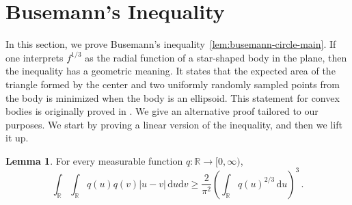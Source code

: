 \documentclass[reqno, 11pt]{amsart}
\theoremstyle{definition}
\newtheorem{lemma}{Lemma}
\newcommand{\abs}[1]{\left\lvert#1\right\rvert}
\newcommand{\dd}{\mathrm{d}}
\begin{document}
\section{Busemann's Inequality}\label{sec:busemann}

In this section, we prove Busemann’s inequality~\ref{lem:busemann-circle-main}. If one interprets $f^{1/3}$ as the radial function of a star-shaped body in the plane, then the inequality has a geometric meaning. It states that the expected area of the triangle formed by the center and two uniformly randomly sampled points from the body is minimized when the body is an ellipsoid. This statement for convex bodies is originally proved in \cite{Busemann53}. We give an alternative proof tailored to our purposes.  We start by proving a linear version of the inequality, and then we lift it up.

\begin{lemma}\label{lem:busemann-line}
For every measurable function $q:{\mathbb R}\to[0,\infty)$,
\begin{equation}\label{eq:busemann-line}
        \int_{{\mathbb R}}\int_{{\mathbb R}}q(u)q(v)\abs{u-v}\,\dd u\dd v
        \ge
        \frac{2}{\pi^2}
        \left(\int_{{\mathbb R}}q(u)^{2/3}\,\dd u\right)^3\,.
\end{equation}
\end{lemma}
\end{document}
